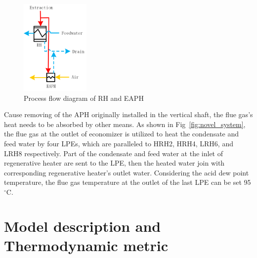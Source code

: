 \documentclass[preprint,12pt]{elsarticle}
\begin{document}
\begin{figure}[htbp]
\centering
\includegraphics[width=0.3\textwidth]{fig/extracion_heat_APH.png}%
\caption{Process flow diagram of RH and EAPH} 
\label{fig:extraction_heat_APH}
\end{figure}

Cause removing of the APH originally installed in the vertical shaft, the flue gas's heat needs to be absorbed by other means.
As shown in Fig~\ref{fig:novel_system}, the flue gas at the outlet of economizer is utilized to heat the condensate and feed water by four LPEs, which are paralleled to HRH2, HRH4, LRH6, and LRH8 respectively. 
Part of the condensate and feed water at the inlet of regenerative heater are sent to the LPE, then the heated water join with corresponding regenerative heater's outlet water. 
Considering the acid dew point temperature, the flue gas temperature at the outlet of the last LPE can be set 95$^\circ$C. 


\section{Model description and Thermodynamic metric}
\label{ssub:model_establishment_and_system_analysis_method}
\end{document}
